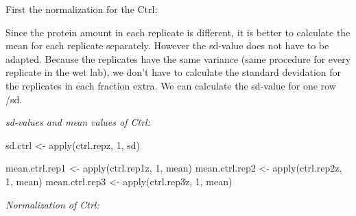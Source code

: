\documentclass[
]{article}
\newenvironment{Shaded}{\begin{snugshade}}{\end{snugshade}}
\newcommand{\DecValTok}[1]{\textcolor[rgb]{0.00,0.00,0.81}{#1}}
\newcommand{\FunctionTok}[1]{\textcolor[rgb]{0.00,0.00,0.00}{#1}}
\newcommand{\NormalTok}[1]{#1}
\newcommand{\OtherTok}[1]{\textcolor[rgb]{0.56,0.35,0.01}{#1}}
\begin{document}
First the normalization for the Ctrl:~

Since the protein amount in each replicate is different, it is better to
calculate the mean for each replicate separately. However the sd-value
does not have to be adapted. Because the replicates have the same
variance (same procedure for every replicate in the wet lab), we don't
have to calculate the standard devidation for the replicates in each
fraction extra. We can calculate the sd-value for one row /sd.

\emph{sd-values and mean values of Ctrl:}

\begin{Shaded}
\begin{Highlighting}[]
\NormalTok{sd.ctrl }\OtherTok{\textless{}{-}} \FunctionTok{apply}\NormalTok{(ctrl.repz, }\DecValTok{1}\NormalTok{, sd)}

\NormalTok{mean.ctrl.rep1 }\OtherTok{\textless{}{-}} \FunctionTok{apply}\NormalTok{(ctrl.rep1z, }\DecValTok{1}\NormalTok{, mean)}
\NormalTok{mean.ctrl.rep2 }\OtherTok{\textless{}{-}} \FunctionTok{apply}\NormalTok{(ctrl.rep2z, }\DecValTok{1}\NormalTok{, mean)}
\NormalTok{mean.ctrl.rep3 }\OtherTok{\textless{}{-}} \FunctionTok{apply}\NormalTok{(ctrl.rep3z, }\DecValTok{1}\NormalTok{, mean)}
\end{Highlighting}
\end{Shaded}

\emph{Normalization of Ctrl:}
\end{document}
